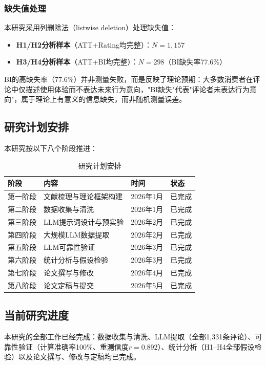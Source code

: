 \subsubsection{缺失值处理}

本研究采用列删除法（listwise deletion）处理缺失值：
\begin{itemize}
  \item \textbf{H1/H2分析样本}（ATT+Rating均完整）：$N=1{,}157$
  \item \textbf{H3/H4分析样本}（ATT+BI均完整）：$N=298$（BI缺失率77.6\%）
\end{itemize}

BI的高缺失率（77.6\%）并非测量失败，而是反映了理论预期：大多数消费者在评论中仅描述使用体验而不表达未来行为意向，"BI缺失"代表"评论者未表达行为意向"，属于理论上有意义的信息缺失，而非随机测量误差。

\subsection{研究计划安排}

本研究按以下八个阶段推进：

\begin{table}[htbp]
\centering
\caption{研究计划安排}
\label{tab:timeline}
\begin{tabular}{@{}llll@{}}
\toprule
阶段 & 内容 & 时间 & 状态 \\
\midrule
第一阶段 & 文献梳理与理论框架构建 & 2026年1月 & 已完成 \\
第二阶段 & 数据收集与清洗 & 2026年1月 & 已完成 \\
第三阶段 & LLM提示词设计与预实验 & 2026年2月 & 已完成 \\
第四阶段 & 大规模LLM数据提取 & 2026年2月 & 已完成 \\
第五阶段 & LLM可靠性验证 & 2026年3月 & 已完成 \\
第六阶段 & 统计分析与假设检验 & 2026年3月 & 已完成 \\
第七阶段 & 论文撰写与修改 & 2026年4月 & 已完成 \\
第八阶段 & 论文定稿与提交 & 2026年5月 & 已完成 \\
\bottomrule
\end{tabular}
\end{table}

\subsection{当前研究进度}

本研究的全部工作已经完成：数据收集与清洗、LLM提取（全部1{,}331条评论）、可靠性验证（计算准确率100\%、重测信度$r=0.892$）、统计分析（H1--H4全部假设检验）以及论文撰写、修改与定稿均已完成。
